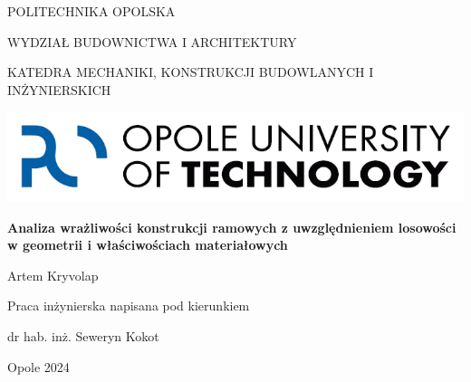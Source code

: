 \begin{titlepage}
    \centering

    {\scshape
    POLITECHNIKA OPOLSKA\par
    WYDZIAŁ BUDOWNICTWA I ARCHITEKTURY\par
    KATEDRA MECHANIKI, KONSTRUKCJI BUDOWLANYCH I INŻYNIERSKICH\par\vspace{2cm}
    }

    \includegraphics[scale=0.4]{images/logo}\par\vspace{2cm}


    {\Large\bfseries
    Analiza wrażliwości konstrukcji ramowych z uwzględnieniem losowości
    w geometrii i właściwościach materiałowych\par\vspace{2cm}
    }

    {\Large Artem Kryvolap \par\vspace{3cm}}

    {\large
    Praca inżynierska napisana pod kierunkiem\par
    dr hab. inż. Seweryn Kokot\par\vspace{3.5cm}
    }

    {\large Opole 2024\par}

    \vfill
\end{titlepage}
